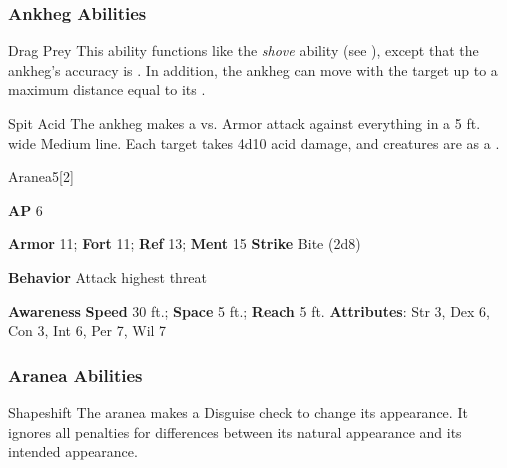 \subsubsection{Ankheg Abilities}

\begin{freeability}{Drag Prey}
This ability functions like the \textit{shove} ability (see ), except that the ankheg's accuracy is .
In addition, the ankheg can move with the target up to a maximum distance equal to its .
\end{freeability}

\vspace{0.5em}
\begin{freeability}{Spit Acid}
The ankheg makes a  vs. Armor attack against everything in a 5 ft. wide Medium line.
\hit Each target takes 4d10 acid damage, and creatures are  as a .
\end{freeability}

\begin{monsection}{Aranea}{5}[2]
\vspace{-1em}\vspace{-1em}
\begin{spellcontent}
\begin{spelltargetinginfo}
{\textbf{AP} 6}

\pari \textbf{Armor} 11;
\textbf{Fort} 11;
\textbf{Ref} 13;
\textbf{Ment} 15
\pari \textbf{Strike} Bite  (2d8)



\pari \textbf{Behavior} Attack highest threat
\end{spelltargetinginfo}
\end{spellcontent}

\begin{monsterfooter}
\pari \textbf{Awareness} 
\pari \textbf{Speed} 30 ft.;
\textbf{Space} 5 ft.;
\textbf{Reach} 5 ft.
\pari \textbf{Attributes}:
Str 3,
Dex 6,
Con 3,
Int 6,
Per 7,
Wil 7
\end{monsterfooter}
\end{monsection}


\subsubsection{Aranea Abilities}

\begin{freeability}{Shapeshift}
The aranea makes a Disguise check to change its appearance.
It ignores all penalties for differences between its natural appearance and its intended appearance.
\end{freeability}

